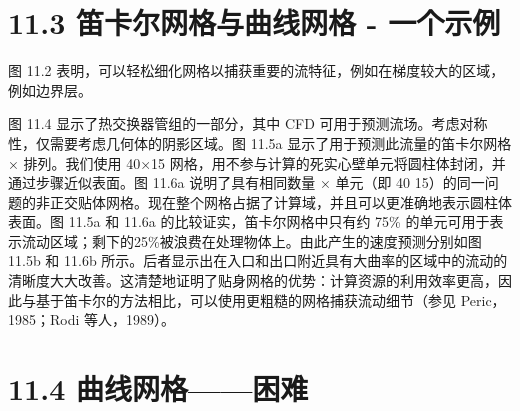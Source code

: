 \documentclass[11pt,a4paper,openany,fontset=none]{ctexbook}
\begin{document}
\section*{11.3 笛卡尔网格与曲线网格 - 一个示例}

图 11.2 表明，可以轻松细化网格以捕获重要的流特征，例如在梯度较大的区域，例如边界层。

图 11.4 显示了热交换器管组的一部分，其中 CFD 可用于预测流场。考虑对称性，仅需要考虑几何体的阴影区域。图 11.5a 显示了用于预测此流量的笛卡尔网格 × 排列。我们使用 40×15 网格，用不参与计算的死实心壁单元将圆柱体封闭，并通过步骤近似表面。图 11.6a 说明了具有相同数量 × 单元（即 40 15）的同一问题的非正交贴体网格。现在整个网格占据了计算域，并且可以更准确地表示圆柱体表面。图 11.5a 和 11.6a 的比较证实，笛卡尔网格中只有约 75\% 的单元可用于表示流动区域；剩下的25\%被浪费在处理物体上。由此产生的速度预测分别如图 11.5b 和 11.6b 所示。后者显示出在入口和出口附近具有大曲率的区域中的流动的清晰度大大改善。这清楚地证明了贴身网格的优势：计算资源的利用效率更高，因此与基于笛卡尔的方法相比，可以使用更粗糙的网格捕获流动细节（参见 Peric，1985；Rodi 等人，1989）。

\section*{11.4 曲线网格——困难}
\end{document}
